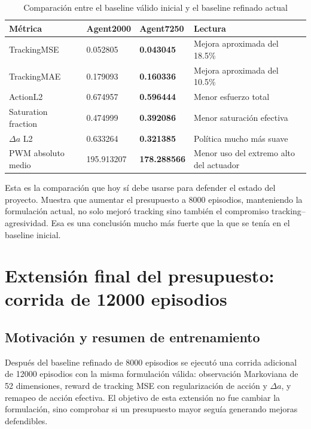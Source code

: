 \documentclass[11pt,a4paper]{article}
\begin{document}
\begin{table}[H]
\centering
\caption{Comparaci\'on entre el baseline v\'alido inicial y el baseline refinado actual}
\label{tab:valid-comparison}
\small
\renewcommand{\arraystretch}{1.15}
\begin{tabularx}{\textwidth}{L{3.8cm}C{2.2cm}C{2.2cm}Y}
\toprule
\textbf{M\'etrica} & \textbf{Agent2000} & \textbf{Agent7250} & \textbf{Lectura} \\
\midrule
TrackingMSE & 0.052805 & \textbf{0.043045} & Mejora aproximada del 18.5\% \\
TrackingMAE & 0.179093 & \textbf{0.160336} & Mejora aproximada del 10.5\% \\
ActionL2 & 0.674957 & \textbf{0.596444} & Menor esfuerzo total \\
Saturation fraction & 0.474999 & \textbf{0.392086} & Menor saturaci\'on efectiva \\
\(\Delta a\) L2 & 0.633264 & \textbf{0.321385} & Pol\'itica mucho m\'as suave \\
PWM absoluto medio & 195.913207 & \textbf{178.288566} & Menor uso del extremo alto del actuador \\
\bottomrule
\end{tabularx}
\end{table}

Esta es la comparaci\'on que hoy s\'i debe usarse para defender el estado del proyecto. Muestra que aumentar el presupuesto a 8000 episodios, manteniendo la formulaci\'on actual, no solo mejor\'o tracking sino tambi\'en el compromiso tracking--agresividad. Esa es una conclusi\'on mucho m\'as fuerte que la que se ten\'ia en el baseline inicial.

\section{Extensi\'on final del presupuesto: corrida de 12000 episodios}

\subsection{Motivaci\'on y resumen de entrenamiento}

Despu\'es del baseline refinado de 8000 episodios se ejecut\'o una corrida adicional de 12000 episodios con la misma formulaci\'on v\'alida: observaci\'on Markoviana de 52 dimensiones, reward de tracking MSE con regularizaci\'on de acci\'on y \(\Delta a\), y remapeo de acci\'on efectiva. El objetivo de esta extensi\'on no fue cambiar la formulaci\'on, sino comprobar si un presupuesto mayor segu\'ia generando mejoras defendibles.
\end{document}
